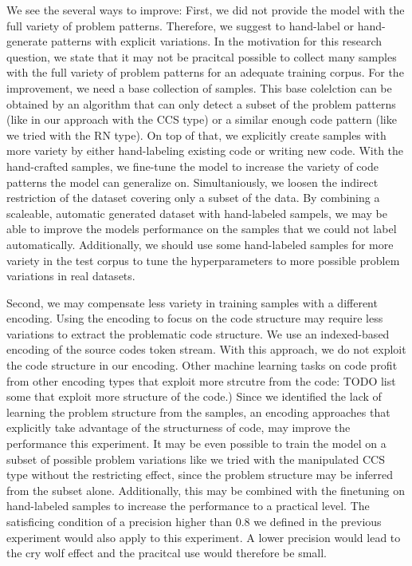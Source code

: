 We see the several ways to improve:
First, we did not provide the model with the full variety of problem patterns. Therefore, we suggest to hand-label or hand-generate patterns with explicit variations.
In the motivation for this research question, we state that it may not be pracitcal possible to collect many samples with the full variety of problem patterns for an adequate training corpus. For the improvement, we need a base collection of samples. This base colelction can be obtained by an algorithm that can only detect a subset of the problem patterns (like in our approach with the CCS type) or a similar enough code pattern (like we tried with the RN type). On top of that, we explicitly create samples with more variety by either hand-labeling existing code or writing new code. With the hand-crafted samples, we fine-tune the model to increase the variety of code patterns the model can generalize on. Simultaniously, we loosen the indirect restriction of the dataset covering only a subset of the data. By combining a scaleable, automatic generated dataset with hand-labeled sampels, we may be able to improve the models performance on the samples that we could not label automatically. Additionally, we should use some hand-labeled samples for more variety in the test corpus to tune the hyperparameters to more possible problem variations in real datasets.

Second, we may compensate less variety in training samples with a different encoding. Using the encoding to focus on the code structure may require less variations to extract the problematic code structure. We use an indexed-based encoding of the source codes token stream. With this approach, we do not exploit the code structure in our encoding. Other machine learning tasks on code profit from other encoding types that exploit more strcutre from the code: TODO list some that exploit more structure of the code.) Since we identified the lack of learning the problem structure from the samples, an encoding approaches that explicitly take advantage of the structurness of code, may improve the performance this experiment. It may be even possible to train the model on a subset of possible problem variations like we tried with the manipulated CCS type without the restricting effect, since the problem structure may be inferred from the subset alone. Additionally, this may be combined with the finetuning on hand-labeled samples to increase the performance to a practical level. The satisficing condition of a precision higher than 0.8 we defined in the previous experiment would also apply to this experiment. A lower precision would lead to the cry wolf effect and the pracitcal use would therefore be small.

